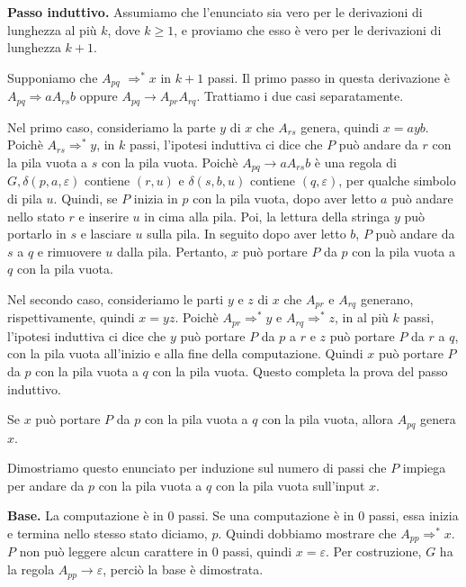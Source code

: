 \documentclass{article}
\begin{document}
\textbf{Passo induttivo.}
Assumiamo che l'enunciato sia vero per le derivazioni di lunghezza al più $k$, dove $k \geq 1$, e proviamo che esso è vero per le derivazioni di lunghezza $k+1$.

Supponiamo che $A_{pq}$ $\Rightarrow^{*} x$ in $k+1$ passi.
Il primo passo in questa derivazione è $A_{pq} \Rightarrow aA_{rs}b$ oppure $A_{pq} \rightarrow A_{pr}A_{rq}$.
Trattiamo i due casi separatamente.

Nel primo caso, consideriamo la parte $y$ di $x$ che $A_{rs}$ genera, quindi $x = ayb$.
Poichè $A_{rs} \Rightarrow^{*} y$, in $k$ passi, l'ipotesi induttiva ci dice che $P$ può andare da $r$ con la pila vuota a $s$ con la pila vuota.
Poichè $A_{pq} \rightarrow aA_{rs}b$ è una regola di $G, \delta(p,a,\varepsilon)$ contiene $(r,u)$ e $\delta(s,b,u)$ contiene $(q,\varepsilon)$, per qualche simbolo di pila $u$.
Quindi, se $P$ inizia in $p$ con la pila vuota, dopo aver letto $a$ può andare nello stato $r$ e inserire $u$ in cima alla pila.
Poi, la lettura della stringa $y$ può portarlo in $s$ e lasciare $u$ sulla pila.
In seguito dopo aver letto $b$, $P$ può andare da $s$ a $q$ e rimuovere $u$ dalla pila.
Pertanto, $x$ può portare $P$ da $p$ con la pila vuota a $q$ con la pila vuota.

Nel secondo caso, consideriamo le parti $y$ e $z$ di $x$ che $A_{pr}$ e $A_{rq}$ generano, rispettivamente, quindi $x = yz$.
Poichè $A_{pr} \Rightarrow^{*} y$ e $A_{rq} \Rightarrow^{*} z$, in al più $k$ passi, l'ipotesi induttiva ci dice che $y$ può portare $P$ da $p$ a $r$ e $z$ può portare $P$ da $r$ a $q$, con la pila vuota all'inizio e alla fine della computazione.
Quindi $x$ può portare $P$ da $p$ con la pila vuota a $q$ con la pila vuota.
Questo completa la prova del passo induttivo.

\begin{tcolorbox}[colback=yellow!10!white, colframe=yellow!50!black, title=Fatto 2.31]
    Se $x$ può portare $P$ da $p$ con la pila vuota a $q$ con la pila vuota, allora $A_{pq}$ genera $x$.
\end{tcolorbox}

Dimostriamo questo enunciato per induzione sul numero di passi che $P$ impiega per andare da $p$ con la pila vuota a $q$ con la pila vuota sull'input $x$.
\vspace{1em}

\textbf{Base.}
La computazione è in 0 passi.
Se una computazione è in 0 passi, essa inizia e termina nello stesso stato diciamo, $p$. 
Quindi dobbiamo mostrare che $A_{pp} \Rightarrow^{*} x$. 
$P$ non può leggere alcun carattere in 0 passi, quindi $x = \varepsilon$. 
Per costruzione, $G$ ha la regola $A_{pp} \rightarrow \varepsilon$, perciò la base è dimostrata.
\end{document}
